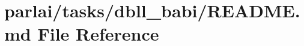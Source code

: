 \hypertarget{parlai_2tasks_2dbll__babi_2README_8md}{}\section{parlai/tasks/dbll\+\_\+babi/\+R\+E\+A\+D\+ME.md File Reference}
\label{parlai_2tasks_2dbll__babi_2README_8md}

